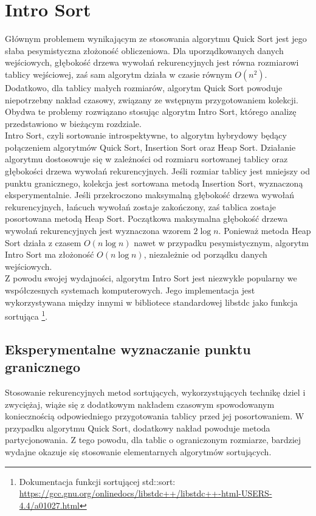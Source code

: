 \newpage
\section{Intro Sort}
Głównym problemem wynikającym ze stosowania algorytmu Quick Sort jest jego słaba pesymistyczna złożoność obliczeniowa. Dla uporządkowanych danych wejściowych, głębokość drzewa wywołań rekurencyjnych jest równa rozmiarowi tablicy wejściowej, zaś sam algorytm działa w czasie równym $O(n^2)$. Dodatkowo, dla tablicy małych rozmiarów, algorytm Quick Sort powoduje niepotrzebny nakład czasowy, związany ze wstępnym przygotowaniem kolekcji. Obydwa te problemy rozwiązano stosując algorytm Intro Sort, którego analizę przedstawiono w bieżącym rozdziale.\\

Intro Sort, czyli sortowanie introspektywne, to algorytm hybrydowy będący połączeniem algorytmów Quick Sort, Insertion Sort oraz Heap Sort. Działanie algorytmu dostosowuje się w zależności od rozmiaru sortowanej tablicy oraz głębokości drzewa wywołań rekurencyjnych. Jeśli rozmiar tablicy jest mniejszy od punktu granicznego, kolekcja jest sortowana metodą Insertion Sort, wyznaczoną eksperymentalnie. Jeśli przekroczono maksymalną głębokość drzewa wywołań rekurencyjnych, łańcuch wywołań zostaje zakończony, zaś tablica zostaje posortowana metodą Heap Sort. Początkowa maksymalna głębokość drzewa wywołań rekurencyjnych jest wyznaczona wzorem $2\log{n}$. Ponieważ metoda Heap Sort działa z czasem $O(n\log{n})$ nawet w przypadku pesymistycznym, algorytm Intro Sort ma złożoność $O(n\log{n})$, niezależnie od porządku danych wejściowych.\\

Z powodu swojej wydajności, algorytm Intro Sort jest niezwykle popularny we współczesnych systemach komputerowych. Jego implementacja jest wykorzystywana między innymi w bibliotece standardowej libstdc jako funkcja sortująca \footnote{Dokumentacja funkcji sortującej std::sort: \url{https://gcc.gnu.org/onlinedocs/libstdc++/libstdc++-html-USERS-4.4/a01027.html}}.\\


\subsection{Eksperymentalne wyznaczanie punktu granicznego}
Stosowanie rekurencyjnych metod sortujących, wykorzystujących technikę dziel i zwyciężaj, wiąże się z dodatkowym nakładem czasowym spowodowanym koniecznością odpowiedniego przygotowania tablicy przed jej posortowaniem. W przypadku algorytmu Quick Sort, dodatkowy nakład powoduje metoda partycjonowania. Z tego powodu, dla tablic o ograniczonym rozmiarze, bardziej wydajne okazuje się stosowanie elementarnych algorytmów sortujących.\\

